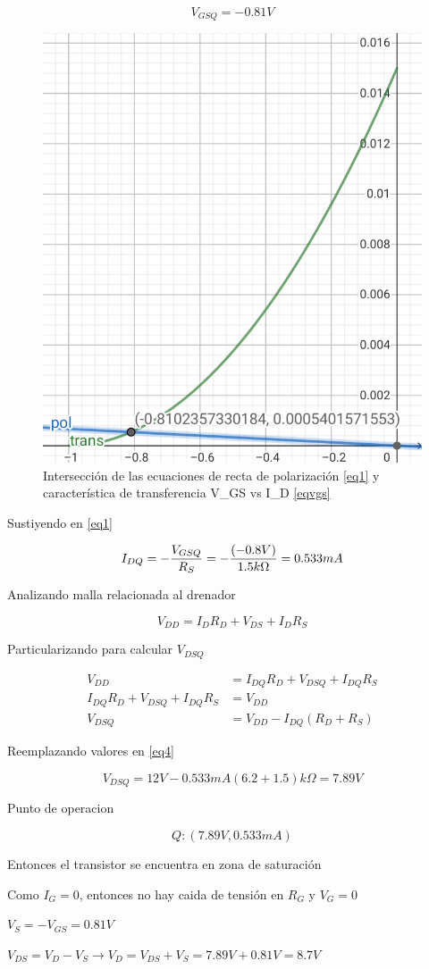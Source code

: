 \documentclass[12pt, a4paper]{article}
\begin{document}
    $$V_{GSQ} = -0.81V$$

    \begin{figure}[h!]
        \centering
        \includegraphics[height=5cm\textwidth]{grafQ.png}
        \caption{Intersección de las ecuaciones de recta de polarización \eqref{eq1} y característica de transferencia V_{GS} vs I_D \eqref{eqvgs}}
        \label{fig:vgsq}
    \end{figure}

    Sustiyendo en \eqref{eq1}

    $$I_{DQ} = -{V_{GSQ} \over R_S} = -{(-0.8V) \over 1.5k\Omega} = 0.533mA$$

    Analizando malla relacionada al drenador

    $$V_{DD} = I_DR_D + V_{DS} + I_DR_S$$

    Particularizando para calcular $V_{DSQ}$

    \begin{equation}
        \label{eq4}
        \begin{split}
            V_{DD} & = I_{DQ}R_D + V_{DSQ} + I_{DQ}R_S \\
            I_{DQ}R_D + V_{DSQ} + I_{DQ}R_S & = V_{DD} \\
            V_{DSQ} & = V_{DD} - I_{DQ}(R_D + R_S)
        \end{split}
    \end{equation}
    
    Reemplazando valores en \eqref{eq4}

    $$V_{DSQ} = 12V - 0.533mA(6.2 + 1.5)k\Omega = 7.89V$$

    Punto de operacion

    $$Q : (7.89V, 0.533mA)$$

    Entonces el transistor se encuentra en zona de saturación
    
    Como $I_G = 0$, entonces no hay caida de tensión en $R_G$ y $V_G = 0$

    $V_S = - V_{GS} = 0.81V$

    $V_{DS} = V_D - V_S \rightarrow V_D = V_{DS} + V_S = 7.89V + 0.81V = 8.7V$
\end{document}

